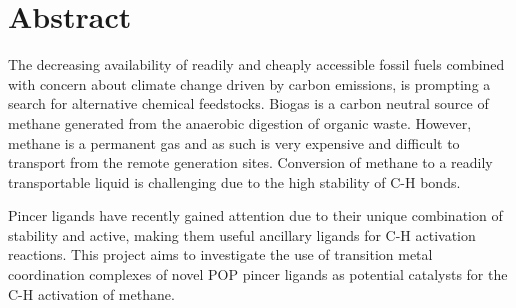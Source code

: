 
\chapter*{Abstract}
\label{ch:abstract}

The decreasing availability of readily and cheaply accessible fossil fuels combined with concern about climate change driven by carbon emissions, is prompting a search for alternative chemical feedstocks. Biogas is a carbon neutral source of methane generated from the anaerobic digestion of organic waste. However, methane is a permanent gas and as such is very expensive and difficult to transport from the remote generation sites. Conversion of methane to a readily transportable liquid is challenging due to the high stability of C-H bonds.

Pincer ligands have recently gained attention due to their unique combination of stability and active, making them useful ancillary ligands for C-H activation reactions. This project aims to investigate the use of transition metal coordination complexes of novel POP pincer ligands as potential catalysts for the C-H activation of methane.

